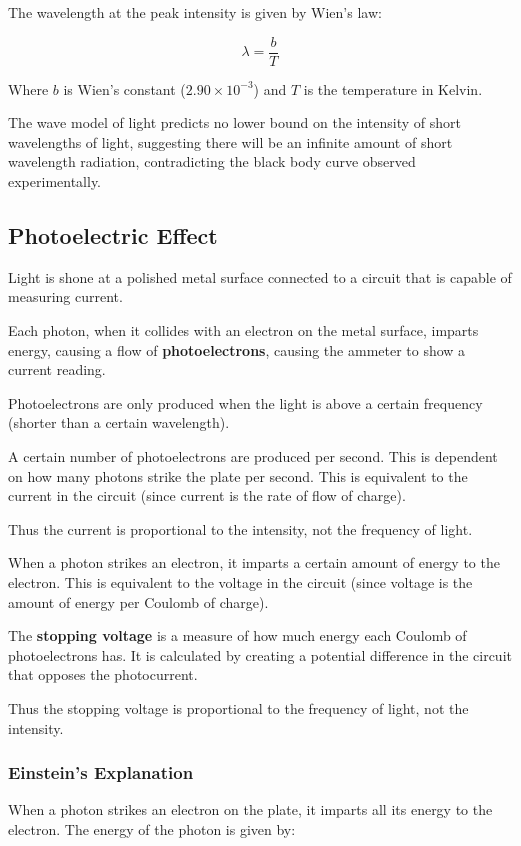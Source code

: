 \documentclass[a4paper,11pt]{report}
\begin{document}
The wavelength at the peak intensity is given by Wien's law:

$$
\lambda = \frac{b}{T}
$$

Where $b$ is Wien's constant ($2.90 \times 10^{-3}$) and $T$ is the temperature
in Kelvin.

The wave model of light predicts no lower bound on the intensity of short
wavelengths of light, suggesting there will be an infinite amount of short
wavelength radiation, contradicting the black body curve observed
experimentally.

\subsection{Photoelectric Effect}

Light is shone at a polished metal surface connected to a circuit that is
capable of measuring current.

Each photon, when it collides with an electron on the metal surface, imparts
energy, causing a flow of \textbf{photoelectrons}, causing the ammeter to show
a current reading.

Photoelectrons are only produced when the light is above a certain frequency
(shorter than a certain wavelength).

A certain number of photoelectrons are produced per second. This is dependent
on how many photons strike the plate per second. This is equivalent to the
current in the circuit (since current is the rate of flow of charge).

Thus the current is proportional to the intensity, not the frequency of light.

When a photon strikes an electron, it imparts a certain amount of energy to
the electron. This is equivalent to the voltage in the circuit (since voltage
is the amount of energy per Coulomb of charge).

The \textbf{stopping voltage} is a measure of how much energy each Coulomb of
photoelectrons has. It is calculated by creating a potential difference in the
circuit that opposes the photocurrent.

Thus the stopping voltage is proportional to the frequency of light, not the
intensity.

\subsubsection{Einstein's Explanation}

When a photon strikes an electron on the plate, it imparts all its energy to
the electron. The energy of the photon is given by:
\end{document}
